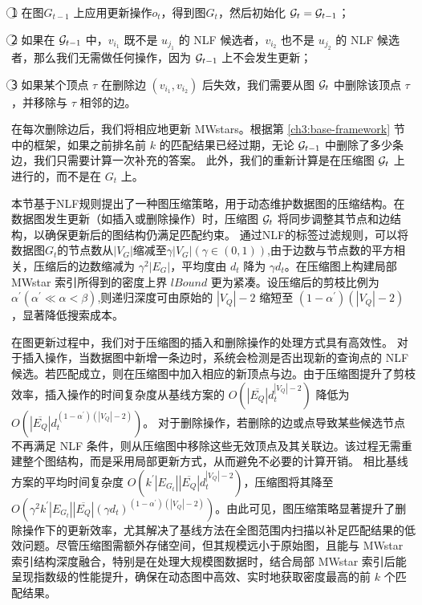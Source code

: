 \textcircled{1} 在图$G_{t-1}$ 上应用更新操作$o_t$，得到图$G_t$，然后初始化 $\mathcal{G}_t = \mathcal{G}_{t-1}$；

\textcircled{2} 如果在 $\mathcal{G}_{t-1}$ 中，$v_{i_1}$ 既不是 $u_{j_1}$ 的 NLF 候选者，$v_{i_2}$ 也不是 $u_{j_2}$ 的 NLF 候选者，那么我们无需做任何操作，因为 $\mathcal{G}_{t-1}$ 上不会发生更新；

\textcircled{3} 如果某个顶点 $\tau$ 在删除边 $(v_{i_1}, v_{i_2})$ 后失效，我们需要从图 $\mathcal{G}_t$ 中删除该顶点 $\tau$，并移除与 $\tau$ 相邻的边。

在每次删除边后，我们将相应地更新 MWstars。根据第 \ref{ch3:base-framework} 节中的框架，如果之前排名前 $k$ 的匹配结果已经过期，无论 $\mathcal{G}_{t-1}$ 中删除了多少条边，我们只需要计算一次补充的答案。
此外，我们的重新计算是在压缩图 $\mathcal{G}_t$ 上进行的，而不是在 $G_t$ 上。



本节基于NLF规则提出了一种图压缩策略，用于动态维护数据图的压缩结构。在数据图发生更新（如插入或删除操作）时，压缩图 $\mathcal{G}_t$ 将同步调整其节点和边结构，以确保更新后的图结构仍满足匹配约束。
通过NLF的标签过滤规则，可以将数据图$G_t$的节点数从$|V_G|$缩减至$\gamma|V_G|(\gamma\in(0,1))$,由于边数与节点数的平方相关，压缩后的边数缩减为 $\gamma^2 |E_G|$，平均度由 $d_t$ 降为 $\gamma d_t$。在压缩图上构建局部 MWstar 索引所得到的密度上界 $lBound$ 更为紧凑。设压缩后的剪枝比例为$\alpha^{\prime}(\alpha^{\prime}\ll\alpha<\beta)$,则递归深度可由原始的 $|V_Q|-2$ 缩短至 $(1 - \alpha^{\prime})(|V_Q| - 2)$，显著降低搜索成本。

在图更新过程中，我们对于压缩图的插入和删除操作的处理方式具有高效性。
对于插入操作，当数据图中新增一条边时，系统会检测是否出现新的查询点的 NLF 候选。若匹配成立，则在压缩图中加入相应的新顶点与边。由于压缩图提升了剪枝效率，插入操作的时间复杂度从基线方案的 $O(|\overline{E_Q}| d_t^{|V_Q|-2})$ 降低为 $O(|\overline{E_Q}| d_t^{(1 - \alpha^{\prime})(|V_Q| - 2)})$。
对于删除操作，若删除的边或点导致某些候选节点不再满足 NLF 条件，则从压缩图中移除这些无效顶点及其关联边。该过程无需重建整个图结构，而是采用局部更新方式，从而避免不必要的计算开销。
相比基线方案的平均时间复杂度 $O(k^{\prime}|E_{G_t}| |\overline{E_Q}| d_t^{|V_Q| - 2})$，压缩图将其降至 $O(\gamma^2 k^{\prime}|E_{G_t}| |\overline{E_Q}| (\gamma d_t)^{(1 - \alpha^{\prime})(|V_Q| - 2)})$。由此可见，图压缩策略显著提升了删除操作下的更新效率，尤其解决了基线方法在全图范围内扫描以补足匹配结果的低效问题。尽管压缩图需额外存储空间，但其规模远小于原始图，且能与 MWstar 索引结构深度融合，特别是在处理大规模图数据时，结合局部 MWstar 索引后能呈现指数级的性能提升，确保在动态图中高效、实时地获取密度最高的前 $k$ 个匹配结果。

